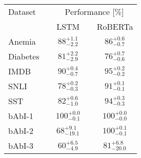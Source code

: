 \documentclass{standalone}
\begin{document}
\centering
\begin{tabular}{l c c c c}
    \toprule
    Dataset & & \multicolumn{3}{c}{Performance [\%]} \\
    \cmidrule(r){3-5}
    & & LSTM & & RoBERTa \\
    \midrule
    Anemia & & $88^{+1.1}_{-2.2}$ & & $86^{+0.6}_{-0.7}$ \\
    Diabetes & & $81^{+2.2}_{-2.9}$ & & $76^{+0.7}_{-0.6}$ \\
    IMDB & & $90^{+0.4}_{-0.7}$ & & $95^{+0.2}_{-0.2}$ \\
    SNLI & & $78^{+0.2}_{-0.3}$ & & $91^{+0.1}_{-0.1}$ \\
    SST & & $82^{+0.6}_{-1.0}$ & & $94^{+0.3}_{-0.3}$ \\
    bAbI-1 & & $100^{+0.0}_{-0.1}$ & & $100^{+0.0}_{-0.0}$ \\
    bAbI-2 & & $68^{+9.1}_{-19.1}$ & & $100^{+0.1}_{-0.1}$ \\
    bAbI-3 & & $60^{+6.5}_{-4.9}$ & & $81^{+6.8}_{-20.0}$ \\
    \bottomrule
\end{tabular}
\endminipage
\end{document}

